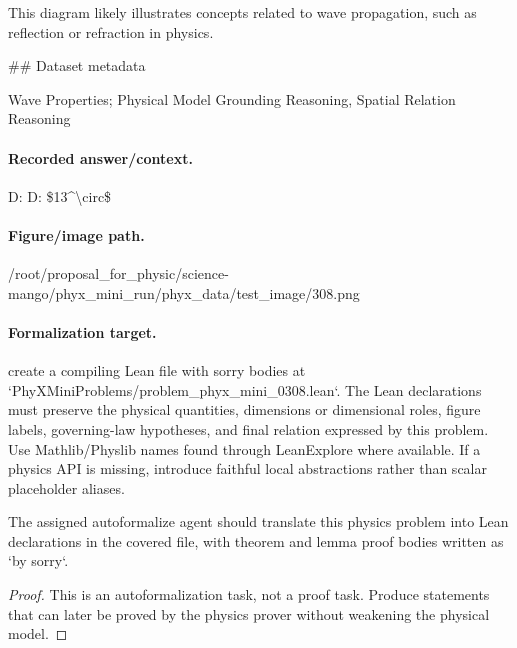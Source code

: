 This diagram likely illustrates concepts related to wave propagation, such as reflection or refraction in physics.

\#\# Dataset metadata

Wave Properties; Physical Model Grounding Reasoning, Spatial Relation Reasoning

\paragraph{Recorded answer/context.}
D: D: \$13\textasciicircum{}\textbackslash{}circ\$

\paragraph{Figure/image path.}
/root/proposal\_for\_physic/science-mango/phyx\_mini\_run/phyx\_data/test\_image/308.png

\paragraph{Formalization target.}
create a compiling Lean file with sorry bodies at `PhyXMiniProblems/problem\_phyx\_mini\_0308.lean`. The Lean declarations must preserve the physical quantities, dimensions or dimensional roles, figure labels, governing-law hypotheses, and final relation expressed by this problem.
Use Mathlib/Physlib names found through LeanExplore where available. If a physics API is missing, introduce faithful local abstractions rather than scalar placeholder aliases.

\begin{theorem}
\label{thm:physics:phyx_mini_0308:target}
The assigned autoformalize agent should translate this physics problem into Lean declarations in the covered file, with theorem and lemma proof bodies written as `by sorry`.
\end{theorem}
\begin{proof}
This is an autoformalization task, not a proof task. Produce statements that can later be proved by the physics prover without weakening the physical model.
\end{proof}

